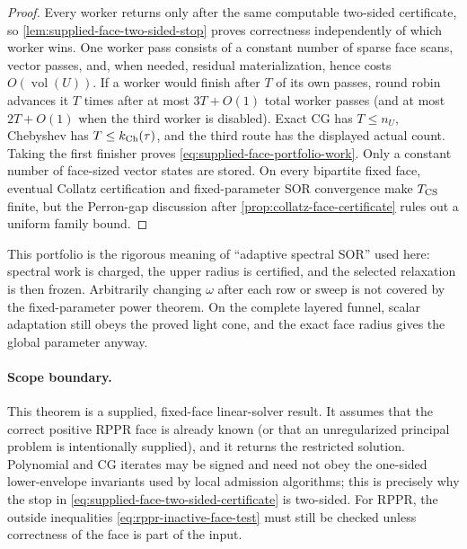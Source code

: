 \begin{proof}
Every worker returns only after the same computable two-sided certificate, so
\cref{lem:supplied-face-two-sided-stop} proves correctness independently of
which worker wins.  One worker pass consists of a constant number of sparse
face scans, vector passes, and, when needed, residual materialization, hence
costs $O(\operatorname{vol}(U))$.  If a worker would finish after $T$ of its
own passes, round robin advances it $T$ times after at most $3T+O(1)$ total
worker passes (and at most $2T+O(1)$ when the third worker is disabled).
Exact CG has $T\le n_U$, Chebyshev has
$T\le k_{\rm Ch}(\tau)$, and the third route has the displayed actual count.
Taking the first finisher proves \eqref{eq:supplied-face-portfolio-work}.
Only a constant number of face-sized vector states are stored.  On every
bipartite fixed face, eventual Collatz certification and fixed-parameter SOR
convergence make $T_{\rm CS}$ finite, but the Perron-gap discussion after
\cref{prop:collatz-face-certificate} rules out a uniform family bound.
\end{proof}

This portfolio is the rigorous meaning of ``adaptive spectral SOR'' used
here: spectral work is charged, the upper radius is certified, and the
selected relaxation is then frozen.  Arbitrarily changing $\omega$ after
each row or sweep is not covered by the fixed-parameter power theorem.  On
the complete layered funnel, scalar adaptation still obeys the proved light
cone, and the exact face radius gives the global parameter anyway.

\paragraph{Scope boundary.}
This theorem is a supplied, fixed-face linear-solver result.  It assumes that
the correct positive RPPR face is already known (or that an unregularized
principal problem is intentionally supplied), and it returns the restricted
solution.  Polynomial and CG iterates may be signed and need not obey the
one-sided lower-envelope invariants used by local admission algorithms; this
is precisely why the stop in
\eqref{eq:supplied-face-two-sided-certificate} is two-sided.  For RPPR, the
outside inequalities \eqref{eq:rppr-inactive-face-test} must still be checked
unless correctness of the face is part of the input.

